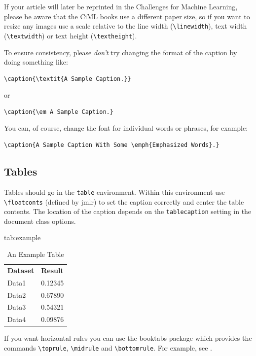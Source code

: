 \documentclass[pmlr,twocolumn,10pt]{jmlr} %
\begin{document}
If your article will later be reprinted in the Challenges for
Machine Learning, please be aware that the CiML books use a
different paper size, so if you want to resize any images use a
scale relative to the line width (\verb|\linewidth|), text width
(\verb|\textwidth|) or text height (\verb|\textheight|).

To ensure consistency, please \emph{don't} try changing the format of the caption by doing
something like:
\begin{verbatim}
\caption{\textit{A Sample Caption.}}
\end{verbatim}
or
\begin{verbatim}
\caption{\em A Sample Caption.}
\end{verbatim}
You can, of course, change the font for individual words or 
phrases, for example:
\begin{verbatim}
\caption{A Sample Caption With Some \emph{Emphasized Words}.}
\end{verbatim}

\subsection{Tables}
\label{sec:tables}

Tables should go in the \texttt{table} environment. Within this
environment use \verb|\floatconts| (defined by \textsf{jmlr})
to set the caption correctly and center the table contents.
The location of the caption depends on the \verb|tablecaption|
setting in the document class options.

\begin{table}[htbp]
\floatconts
  {tab:example}%
  {\caption{An Example Table}}%
  {\begin{tabular}{ll}
  \bfseries Dataset & \bfseries Result\\
  Data1 & 0.12345\\
  Data2 & 0.67890\\
  Data3 & 0.54321\\
  Data4 & 0.09876
  \end{tabular}}
\end{table}

If you want horizontal rules you can use the \textsf{booktabs}
package which provides the commands \verb|\toprule|, 
\verb|\midrule| and \verb|\bottomrule|. For example, see
.
\end{document}
